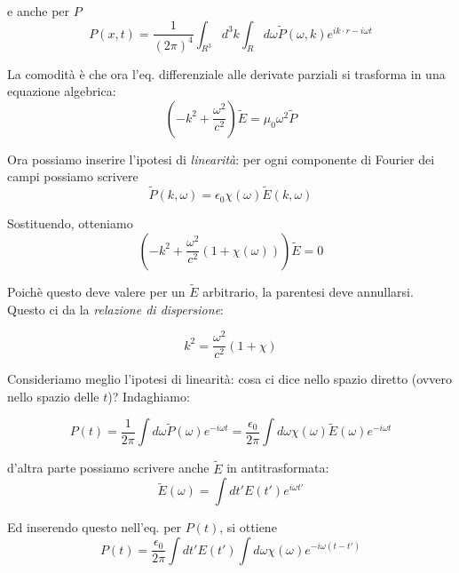 \documentclass{report}
\begin{document}
e anche per $P$
\begin{equation}
    P(x, t) = \frac{1}{(2\pi)^4}\int_{R^3} d^3k \int_Rd\omega \tilde{P}(\omega, k)e^{ik\cdot r - i\omega t}
\end{equation}

La comodità è che ora l'eq. differenziale alle derivate parziali si trasforma in una equazione algebrica: 
\begin{equation}
    \left(-k^2 + \frac{\omega^2}{c^2} \right)\tilde{E} = \mu_0 \omega^2\tilde{P}
\end{equation}

Ora possiamo inserire l'ipotesi di \emph{linearità}: per ogni componente di Fourier dei campi possiamo scrivere 
\begin{equation}
    \tilde{P}(k, \omega) = \epsilon_0\chi( \omega)\tilde{E}(k, \omega)
\end{equation}

Sostituendo, otteniamo
\begin{equation}
    \left(-k^2 + \frac{\omega^2}{c^2}(1 + \chi(\omega)) \right)\tilde{E} = 0 
\end{equation}

Poichè questo deve valere per un $\tilde{E}$ arbitrario, la parentesi deve annullarsi. Questo ci da la \emph{relazione di dispersione}: 

\begin{tcolorbox}[colback=doc!15, colframe=black, boxrule=1pt]
\begin{equation}
    k^2 = \frac{\omega^2}{c^2}(1+\chi)
\end{equation}
\end{tcolorbox}

Consideriamo meglio l'ipotesi di linearità: cosa ci dice nello spazio diretto (ovvero nello spazio delle $t$)? Indaghiamo: 

\begin{equation}
    P(t) = \frac{1}{2\pi}\int d\omega \tilde{P}(\omega)e^{-i\omega t} =\frac{\epsilon_0}{2\pi}\int d\omega \chi(\omega)\tilde{E}(\omega)e^{-i\omega t}
\end{equation}

d'altra parte possiamo scrivere anche $\tilde{E}$ in antitrasformata: 
\begin{equation}
    \tilde{E}(\omega) = \int dt' E(t')e^{i\omega t'}
\end{equation}

Ed inserendo questo nell'eq. per $P(t)$, si ottiene
\begin{equation}
    P(t) = \frac{\epsilon_0}{2\pi}\int dt' E(t')\int d\omega \chi(\omega)e^{-i\omega(t-t')}
\end{equation}
\end{document}
